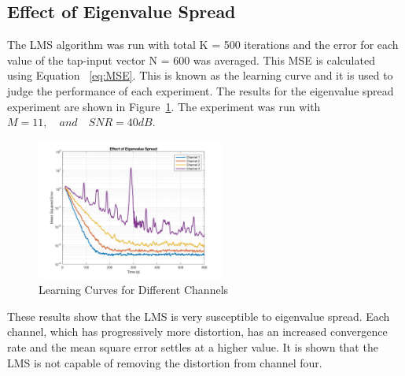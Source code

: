 \documentclass[journal]{IEEEtran}
\begin{document}
\subsection{Effect of Eigenvalue Spread}
The LMS algorithm was run with total K = 500 iterations and the error for each value of the tap-input vector N = 600 was averaged.
This MSE is calculated using Equation ~\ref{eq:MSE}. This is known as the learning curve and it is used to judge the
performance of each experiment. The results for the eigenvalue spread experiment are shown in Figure~\ref{fig:eigenspread}.
The experiment was run with $M = 11, \quad and \quad SNR = 40dB$.

\begin{figure}[H]
  \centering
  \captionsetup{justification=centering,font = small}
  \includegraphics[width=0.55\textwidth, right] {Plots/Project1_Part1_2.jpg}
  \caption{Learning Curves for Different Channels}
    \label{fig:eigenspread}
\end{figure}
These results show that the LMS is very susceptible to eigenvalue spread. Each channel,
which has progressively more distortion, has an increased convergence rate and the mean square
error settles at a higher value. It is shown that the LMS is not capable of
removing the distortion from channel four.
\end{document}
